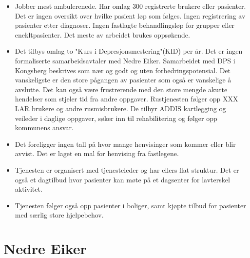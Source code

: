 \documentclass[11pt]{report} %
\begin{document}
                        \begin{itemize}
                    	      \item Jobber mest ambulerenede. Har omlag 300 registrerte brukere eller pasienter. Det er ingen oversikt over hvilke pasient løp som følges. Ingen registrering av pasienter etter  diagnoser. Ingen fastlagte behandlingsløp for grupper eller enekltpasienter. Det meste av arbeidet brukes oppsøkende. 
                            \item Det tilbys omlag to "Kurs i Depresjonsmestering"(KID) per år. Det er ingen formaliserte samarbeidsavtaler med Nedre Eiker. Samarbeidet med DPS i Kongsberg beskrives som nær og godt og uten forbedringspotensial. Det vanskeligste er den store pågangen av pasienter som også er vanskelige å avslutte. Det kan også være frustrerende med den store mengde akutte hendelser som stjeler tid fra andre oppgaver. Rustjenesten følger opp XXX LAR brukere og andre rusmisbrukere. De tilbyr ADDIS kartlegging og veileder i daglige oppgaver, søker inn til rehabilitering og følger opp kommunens ansvar.
                            \item Det foreligger ingen tall på hvor mange henvisinger som kommer eller blir avvist. Det er laget en mal for henvising fra fastlegene. 
                            \item Tjenesten er organisert med tjenesteleder og har ellers flat struktur. Det er også et dagtilbud hvor pasienter kan møte på et dagsenter for lavterskel aktivitet. 
                            \item Tjenesten følger også opp pasienter i boliger, samt kjøpte tilbud for pasienter med særlig store hjelpebehov. 
                        \end{itemize}
                    

                  \section{Nedre Eiker}\label{sec:org_nek}
\end{document}
